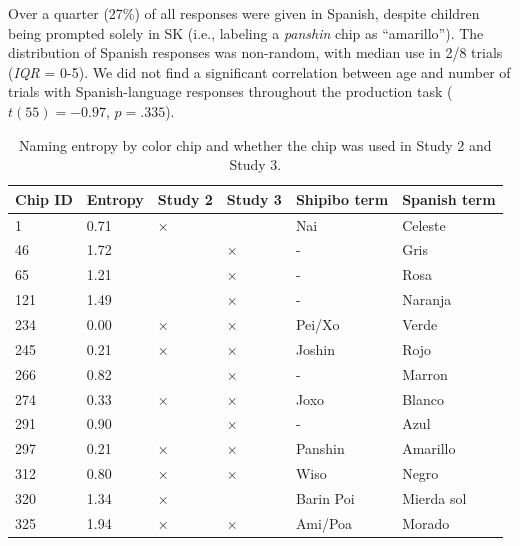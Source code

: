 \documentclass[
  english,
  ,apa7,floatsintext]{apa6}
\begin{document}
Over a quarter (27\%) of all responses were given in Spanish, despite children being prompted solely in SK (i.e., labeling a \emph{panshin} chip as ``amarillo''). The distribution of Spanish responses was non-random, with median use in 2/8 trials (\emph{IQR} = 0-5). We did not find a significant correlation between age and number of trials with Spanish-language responses throughout the production task (\(t(55) = -0.97\), \(p = .335\)).

\begin{table}[tbp]

\begin{center}
\begin{threeparttable}

\caption{\label{tab:study1-entropy-table}Naming entropy by color chip and whether the chip was used in Study 2 and Study 3.}

\begin{tabular}{llllll}
\toprule
Chip ID & \multicolumn{1}{c}{Entropy} & \multicolumn{1}{c}{Study 2} & \multicolumn{1}{c}{Study 3} & \multicolumn{1}{c}{Shipibo term} & \multicolumn{1}{c}{Spanish term}\\
\midrule
1 & 0.71 & × &  & Nai & Celeste\\
46 & 1.72 &  & × & - & Gris\\
65 & 1.21 &  & × & - & Rosa\\
121 & 1.49 &  & × & - & Naranja\\
234 & 0.00 & × & × & Pei/Xo & Verde\\
245 & 0.21 & × & × & Joshin & Rojo\\
266 & 0.82 &  & × & - & Marron\\
274 & 0.33 & × & × & Joxo & Blanco\\
291 & 0.90 &  & × & - & Azul\\
297 & 0.21 & × & × & Panshin & Amarillo\\
312 & 0.80 & × & × & Wiso & Negro\\
320 & 1.34 & × &  & Barin Poi & Mierda sol\\
325 & 1.94 & × & × & Ami/Poa & Morado\\
\bottomrule
\end{tabular}

\end{threeparttable}
\end{center}

\end{table}
\end{document}

